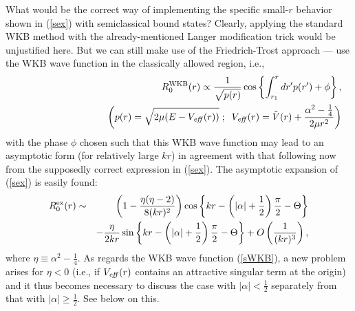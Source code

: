 \documentclass[a4paper,aps,eqsecnum,preprint,preprintnumbers,12pt]{revtex4}
\begin{document}
What would be the correct way of implementing the specific
small-$r$ behavior shown in (\ref{sex}) with semiclassical bound
states? Clearly, applying the standard WKB method with the
already-mentioned Langer modification trick would be unjustified
here. But we can still make use of the Friedrich-Trost approach
--- use the WKB wave function in the classically allowed region,
i.e.,
\begin{eqnarray} \label{sWKB}
&& R_{0}^{\rm WKB}(r) \propto \frac{1}{\sqrt{p(r)}} \cos \left\{
\int_{r_{1}}^{r} dr' p(r') + \phi \right\}, \\
&& \hspace{3cm} \left( p(r) = \sqrt{ 2\mu ( E - V_{\it eff}(r) )
}\; ; \;\; V_{\it eff}(r) = \tilde{V}(r) + \frac{ \alpha^{2} -
\frac{1}{4} }{2\mu r^{2}} \right) \nonumber
\end{eqnarray}
with the phase $\phi$ chosen such that this WKB wave function may
lead to an asymptotic form (for relatively large $kr$) in
agreement with that following now from the supposedly correct
expression in (\ref{sex}). The asymptotic expansion of (\ref{sex})
is easily found:
\begin{eqnarray} \label{saex}
R_{0}^{\rm ex}(r) &\sim& \left( 1 - \frac{\eta(\eta -
2)}{8(kr)^{2}} \right) \cos \left\{ kr - \left( |\alpha| +
\frac{1}{2} \right) \frac{\pi}{2} - \Theta
\right\} \nonumber \\
&& -\frac{\eta}{2kr} \sin \left\{ kr - \left( |\alpha| +
\frac{1}{2} \right) \frac{\pi}{2} - \Theta \right\} + O \left(
\frac{1}{(kr)^{3}} \right),
\end{eqnarray}
where $\eta \equiv \alpha^{2} - \displaystyle \frac{1}{4}$. As
regards the WKB wave function (\ref{sWKB}), a new problem arises
for $\eta<0$ (i.e., if $V_{\it eff}(r)$ contains an attractive
singular term at the origin) and it thus becomes necessary to
discuss the case with $|\alpha| < \displaystyle \frac{1}{2}$
separately from that with $|\alpha| \geq \displaystyle
\frac{1}{2}$. See below on this.
\end{document}
